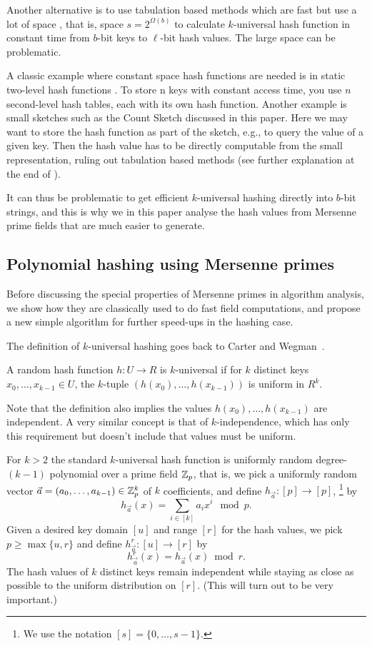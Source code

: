 Another alternative is to use tabulation based methods which are fast
but use a lot of space \cite{Siegel04,Tho13:simple-simple}, that is,
space $s=2^{\Omega(b)}$ to calculate $k$-universal hash function in
constant time from $b$-bit keys to $\ell$-bit hash values. The large
space can be problematic.

A classic example where constant space hash functions are needed is in static two-level hash functions \cite{FKS84}.
To store n keys with constant access time, you use $n$ second-level hash tables, each with its own hash function.
Another example is small sketches such as the Count Sketch \cite{charikar04count-sketch} discussed in this paper.
Here we may want to store the hash function as part of the sketch, e.g., to query the value of a given key.
Then the hash value has to be directly computable from the small representation, ruling out tabulation based methods (see further explanation at the end of ).

It can thus be problematic to get efficient $k$-universal hashing directly into
$b$-bit strings, and this is why we in this paper analyse the
hash values from Mersenne prime fields that are much easier to generate.

\subsection{Polynomial hashing using Mersenne primes}

Before discussing the special properties of Mersenne primes in algorithm analysis, we show how they are classically used to do fast field computations, and propose a new simple algorithm for further speed-ups in the hashing case.

The definition of $k$-universal hashing
goes back to Carter and Wegman~\cite{wegman81kwise}.
\begin{definition}
	A random hash function $h:U\to R$ is $k$-universal if for $k$
	distinct keys $x_0,\ldots,x_{k-1}\in U$, the $k$-tuple
	$(h(x_0),\ldots,h(x_{k-1}))$ is uniform in $R^k$.
\end{definition}
\noindent
Note that the definition also implies the values
$h(x_0),\ldots,h(x_{k-1})$ are independent.
A very similar concept is that of $k$-independence, which has only this requirement but doesn't include that values must be uniform.

For $k>2$ the standard $k$-universal hash function is uniformly random degree-$(k-1)$ polynomial over a prime field
$\mathbb Z_p$, that is, we pick a uniformly random vector
$\vec a=(a_0,\ldots,a_{k-1})\in \mathbb Z_p^k$ of $k$ coefficients, and define
$h_{\vec a}:[p]\to[p]$,
\footnote{ We use the notation $[s]=\{0,\ldots,s-1\}$.  }
by
\[h_{\vec a}(x)=\sum_{i\in[k]}a_i x^i \mod p.\]
%
Given a desired key domain $[u]$ and range $[r]$ for the hash values, we pick
$p\geq \max\{u,r\}$ and define
$h^r_{\vec a}:[u]\to[r]$ by
\[h^r_{\vec a}(x)=h_{\vec a}(x)\bmod r.\]
The  hash values of $k$ distinct keys remain independent while staying as close as possible to the uniform distribution on $[r]$.
(This will turn out to be very important.)

